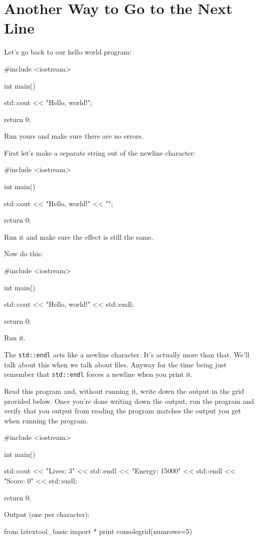\newpage\section{Another Way to Go to the Next Line}

Let's go back to our hello world program:
\begin{console}
#include <iostream>

int main()
{
    std::cout << "Hello, world!\n";

    return 0;
}
\end{console}
Run yours and make sure there are no errors.

First let's make a separate string out of the newline character:
\begin{console}
#include <iostream>

int main()
{
    std::cout << "Hello, world!" << "\n";

    return 0;
}
\end{console}
Run it and make sure the effect is still the same.

Now do this:
\begin{console}
#include <iostream>

int main()
{
    std::cout << "Hello, world!" << std::endl;

    return 0;
}
\end{console}
Run it.

The \verb!std::endl! acts like a newline character. 
It's actually more than that. 
We'll talk about this when we talk about files. 
Anyway for the time being just remember that 
\verb!std::endl! forces a newline when you print it.

\begin{ex}
Read this program and, without running it, write down the output in the 
grid provided below. Once you're done writing down the output, run the program and verify that you output from reading the program matches the output you get when running the program.
\begin{console}
#include <iostream>

int main()
{
    std::cout << "Lives: 3" << std::endl
              << "Energy: 15000" << std::endl
              << "Score: 0" << std::endl;

    return 0;
}
\end{console}
Output (one per character):
\begin{python}
from latextool_basic import *
print consolegrid(numrows=5)
\end{python}
\end{ex}








